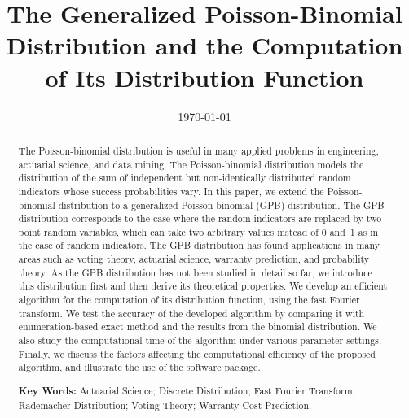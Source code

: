 \documentclass[12pt]{article}
\begin{document}
\title{The Generalized Poisson-Binomial Distribution and the Computation of Its Distribution Function}
\iffalse
\author{Man Zhang and Yili Hong\\
Department of Statistics\\
Virginia Tech\\
Blacksburg, VA 24061, USA
\and
Narayanaswamy Balakrishnan\\
Department of Mathematics and Statistics\\
McMaster University\\
Hamilton, ON, L8S 4K1, Canada
}
\fi

\date{\today}

\maketitle

\begin{abstract}
The Poisson-binomial distribution is useful in many applied problems in engineering, actuarial science, and data mining. The Poisson-binomial distribution models the distribution of the sum of independent but non-identically distributed random indicators whose success probabilities vary. In this paper, we extend the Poisson-binomial distribution to a generalized Poisson-binomial (GPB) distribution. The GPB distribution corresponds to the case where the random indicators are replaced by two-point random variables, which can take two arbitrary values instead of 0 and~1 as in the case of random indicators. The GPB distribution has found applications in many areas such as voting theory, actuarial science, warranty prediction, and probability theory. As the GPB distribution has not been studied in detail so far, we introduce this distribution first and then derive its theoretical properties. We develop an efficient algorithm for the computation of its distribution function, using the fast Fourier transform. We test the accuracy of the developed algorithm by comparing it with enumeration-based exact method and the results from the binomial distribution. We also study the computational time of the algorithm under various parameter settings. Finally, we discuss the factors affecting the computational efficiency of the proposed algorithm, and illustrate the use of the software package.

\textbf{Key Words:} Actuarial Science; Discrete Distribution; Fast Fourier Transform; Rademacher Distribution; Voting Theory; Warranty Cost Prediction.

\end{abstract}
\end{document}
